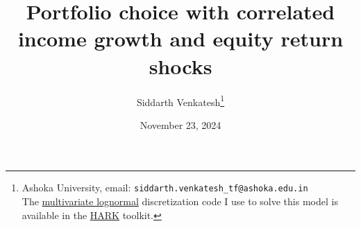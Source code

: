 \documentclass[12pt]{article}
\title{Portfolio choice with correlated income growth and equity return shocks
}
\author{Siddarth Venkatesh\thanks{Ashoka University, email: \texttt{siddarth.venkatesh\_tf@ashoka.edu.in}\\\hspace*{1.8em}The \href{https://github.com/econ-ark/HARK/pull/1412}{multivariate lognormal} discretization code I use to solve this model is available in the \href{https://github.com/econ-ark/HARK}{HARK} toolkit.}}
\date{November 23, 2024}
\newcommand{\cd}{Draft 1} %
\begin{document}


\onehalfspacing






\end{document}
